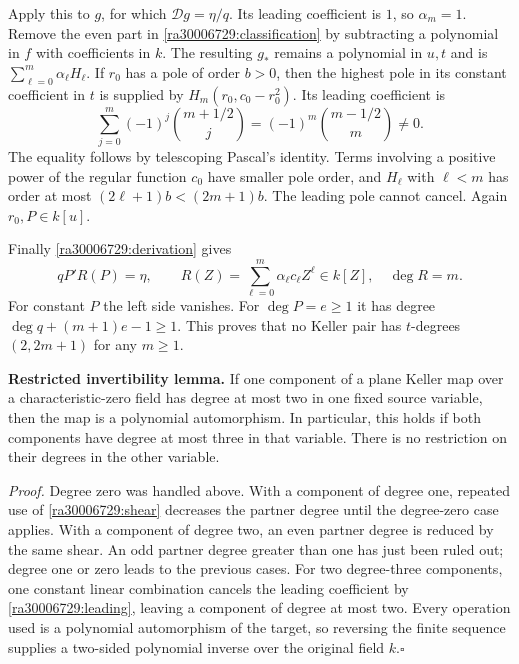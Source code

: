 \documentclass[11pt]{article}
\begin{document}
Apply this to $g$, for which $\mathcal Dg=\eta/q$. Its leading coefficient
is $1$, so $\alpha_m=1$. Remove the even part in
\eqref{ra30006729:classification} by subtracting a polynomial in $f$ with
coefficients in $k$. The resulting $g_*$ remains a polynomial in $u,t$ and
is $\sum_{\ell=0}^m\alpha_\ell H_\ell$.
If $r_0$ has a pole of order $b>0$, then the highest pole in its constant
coefficient in $t$ is supplied by $H_m(r_0,c_0-r_0^2)$. Its leading
coefficient is
\begin{equation}\label{ra30006729:binomialpole}
 \sum_{j=0}^m(-1)^j\binom{m+1/2}{j}
       =(-1)^m\binom{m-1/2}{m}\ne0.
\end{equation}
The equality follows by telescoping Pascal's identity. Terms involving a
positive power of the regular function $c_0$ have smaller pole order, and
$H_\ell$ with $\ell<m$ has order at most $(2\ell+1)b<(2m+1)b$.
The leading pole cannot cancel. Again $r_0,P\in k[u]$.

Finally \eqref{ra30006729:derivation} gives
\begin{equation}\label{ra30006729:oddcontradiction}
 qP'R(P)=\eta,
 \qquad R(Z)=\sum_{\ell=0}^m\alpha_\ell c_\ell Z^\ell\in k[Z],
 \quad \deg R=m.
\end{equation}
For constant $P$ the left side vanishes. For $\deg P=e\ge1$ it has degree
$\deg q+(m+1)e-1\ge1$. This proves that no Keller pair has $t$-degrees
$(2,2m+1)$ for any $m\ge1$.

\textbf{Restricted invertibility lemma.}
If one component of a plane Keller map over a characteristic-zero field
has degree at most two in one fixed source variable, then the map is a
polynomial automorphism. In particular, this holds if both components have
degree at most three in that variable. There is no restriction on their
degrees in the other variable.

\emph{Proof.} Degree zero was handled above. With a component of degree one,
repeated use of \eqref{ra30006729:shear} decreases the partner degree until the
degree-zero case applies. With a component of degree two, an even partner
degree is reduced by the same shear. An odd partner degree greater than one
has just been ruled out; degree one or zero leads to the previous cases.
For two degree-three components, one constant linear combination cancels
the leading coefficient by \eqref{ra30006729:leading}, leaving a component of
degree at most two. Every operation used is a polynomial automorphism of the
target, so reversing the finite sequence supplies a two-sided polynomial
inverse over the original field $k$.\hfill$\square$
\end{document}
